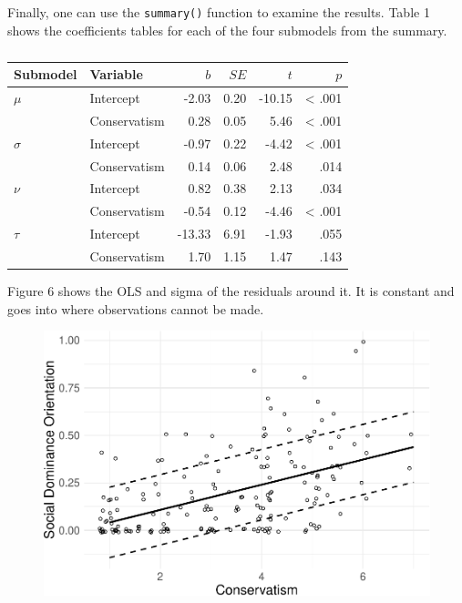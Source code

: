 \documentclass[english,man]{apa6}
\theoremstyle{definition}
\theoremstyle{definition}
\theoremstyle{remark}
\begin{document}
Finally, one can use the \texttt{summary()} function to examine the
results. Table 1 shows the coefficients tables for each of the four
submodels from the summary.

\begin{table}[tbp]
\begin{center}
\begin{threeparttable}
\caption{\label{tab:unnamed-chunk-16}}
\begin{tabular}{llrrrr}
\toprule
Submodel & Variable & $b$ & $SE$ & $t$ & $p$\\
\midrule
$\mu$ & Intercept & -2.03 & 0.20 & -10.15 & < .001\\
 & Conservatism & 0.28 & 0.05 & 5.46 & < .001\\
$\sigma$ & Intercept & -0.97 & 0.22 & -4.42 & < .001\\
 & Conservatism & 0.14 & 0.06 & 2.48 & .014\\
$\nu$ & Intercept & 0.82 & 0.38 & 2.13 & .034\\
 & Conservatism & -0.54 & 0.12 & -4.46 & < .001\\
$\tau$ & Intercept & -13.33 & 6.91 & -1.93 & .055\\
 & Conservatism & 1.70 & 1.15 & 1.47 & .143\\
\bottomrule
\end{tabular}
\end{threeparttable}
\end{center}
\end{table}

Figure 6 shows the OLS and sigma of the residuals around it. It is
constant and goes into where observations cannot be made.

\begin{figure}
\centering
\includegraphics{beta_hurdle_files/figure-latex/unnamed-chunk-17-1.pdf}
\caption{}
\end{figure}
\end{document}
